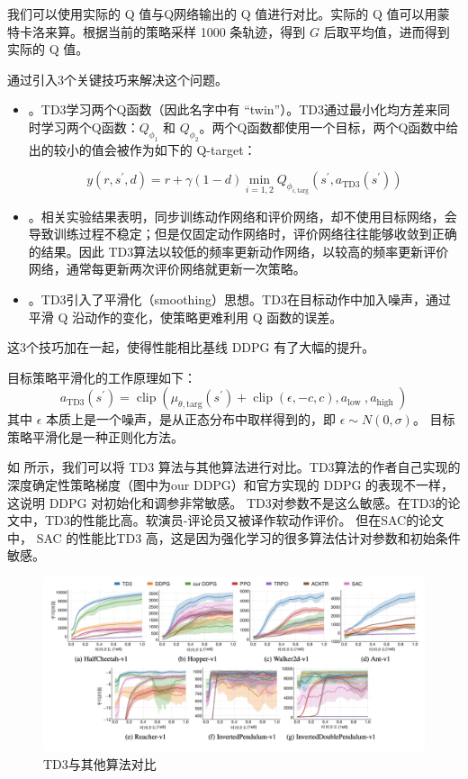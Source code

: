 我们可以使用实际的 Q 值与Q网络输出的 Q 值进行对比。实际的 Q 值可以用蒙特卡洛来算。根据当前的策略采样 1000 条轨迹，得到 $G$ 后取平均值，进而得到实际的 Q 值。

通过引入3个关键技巧来解决这个问题。
\begin{itemize}
\item {} 。TD3学习两个Q函数（因此名字中有 “twin”）。TD3通过最小化均方差来同时学习两个Q函数：$Q_{\phi_1}$ 和 $Q_{\phi_2}$。两个Q函数都使用一个目标，两个Q函数中给出的较小的值会被作为如下的 Q-target：

$$
y\left(r, s^{\prime}, d\right)=r+\gamma(1-d) \min _{i=1,2} Q_{\phi_{i, \text{targ}}}\left(s^{\prime}, a_\text{TD3}\left(s^{\prime}\right)\right)
$$

\item {} 。相关实验结果表明，同步训练动作网络和评价网络，却不使用目标网络，会导致训练过程不稳定；但是仅固定动作网络时，评价网络往往能够收敛到正确的结果。因此 TD3算法以较低的频率更新动作网络，以较高的频率更新评价网络，通常每更新两次评价网络就更新一次策略。
\item  {}。TD3引入了平滑化（smoothing）思想。TD3在目标动作中加入噪声，通过平滑 Q 沿动作的变化，使策略更难利用 Q 函数的误差。
\end{itemize}

这3个技巧加在一起，使得性能相比基线 DDPG 有了大幅的提升。


目标策略平滑化的工作原理如下：
$$
a_\text{TD3}\left(s^{\prime}\right)=\operatorname{clip}\left(\mu_{\theta, \text{targ}}\left(s^{\prime}\right)+\operatorname{clip}(\epsilon,-c, c), a_{\text {low }}, a_{\text {high }}\right)
$$
其中 $\epsilon$ 本质上是一个噪声，是从正态分布中取样得到的，即 $\epsilon \sim N(0,\sigma)$。
目标策略平滑化是一种正则化方法。

如 所示，我们可以将 TD3 算法与其他算法进行对比。TD3算法的作者自己实现的 深度确定性策略梯度（图中为our DDPG）和官方实现的 DDPG 的表现不一样，这说明 DDPG 对初始化和调参非常敏感。
TD3对参数不是这么敏感。在TD3的论文中，TD3的性能比高。软演员-评论员又被译作软动作评价。
但在SAC的论文中， SAC 的性能比TD3 高，这是因为强化学习的很多算法估计对参数和初始条件敏感。

\begin{figure}[hbt]
  \centering
  \includegraphics[width=0.7\linewidth]{res/ch12/12.10}
  \caption{TD3与其他算法对比}
  \label{fig:fig12.10}
\end{figure}

